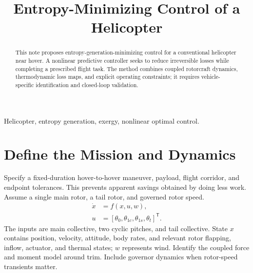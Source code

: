 

\title{Entropy-Minimizing Control of a Helicopter}
\author{
}
\date{}


\maketitle

\begin{abstract}
This note proposes entropy-generation-minimizing control for a conventional
helicopter near hover. A nonlinear predictive controller seeks to reduce
irreversible losses while completing a prescribed flight task. The method
combines coupled rotorcraft dynamics, thermodynamic loss maps, and explicit
operating constraints; it requires vehicle-specific identification and
closed-loop validation.
\end{abstract}

\begin{IEEEkeywords}
Helicopter, entropy generation, exergy, nonlinear optimal control.
\end{IEEEkeywords}

\balance
\section{Define the Mission and Dynamics}
Specify a fixed-duration hover-to-hover maneuver, payload, flight corridor,
and endpoint tolerances. This prevents apparent savings obtained by doing
less work. Assume a single main rotor, a tail rotor, and governed rotor speed.
\begin{equation}
\begin{aligned}
\dot{x}&=f(x,u,w),\\
u&=[\theta_0,\theta_{1c},\theta_{1s},\theta_t]^{\mathsf T}.
\end{aligned}
\end{equation}
The inputs are main collective, two cyclic pitches, and tail collective.
State $x$ contains position, velocity, attitude, body rates, and relevant
rotor flapping, inflow, actuator, and thermal states; $w$ represents wind.
Identify the coupled force and moment model around trim. Include governor
dynamics when rotor-speed transients matter.

